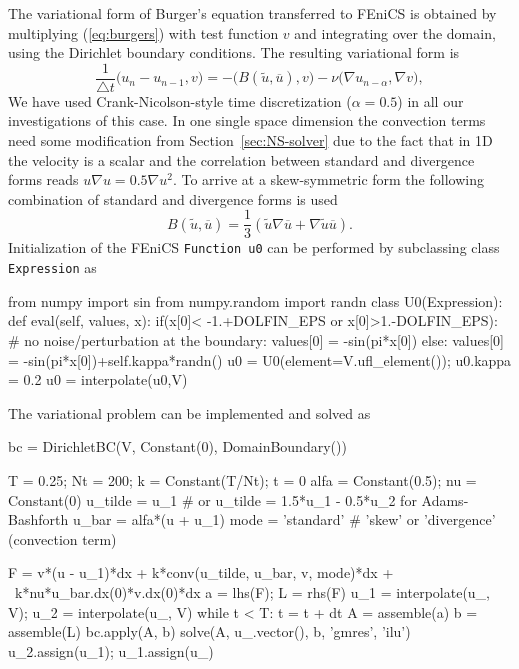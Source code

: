 The variational form of Burger's equation transferred to FEniCS is obtained by multiplying (\ref{eq:burgers}) with test function $v$ and integrating over the domain, using the Dirichlet boundary conditions. The resulting variational form is
\begin{equation}
 \frac{1}{\triangle t}\bigl( u_{n} - u_{n-1} , v\bigr) = - \bigl(B(\tilde{u},\overline{u}), v \bigr) - \nu \bigl( \nabla u_{n-\alpha}, \nabla v \bigr),
\label{eq:burgers_vf}
\end{equation}
We have used Crank-Nicolson-style time discretization ($\alpha=0.5$) in all our investigations of this case. In one single space dimension the convection terms need some modification from Section~\ref{sec:NS-solver} due to the fact that in 1D the velocity is a scalar and the correlation between standard and divergence forms reads $u\nabla u =0.5 \nabla u^2$. To arrive at a skew-symmetric form the following combination of standard and divergence forms is used
\begin{equation}
 B(\tilde{u},\overline{u}) = \frac{1}{3}\left( \tilde{u}\nabla \overline{u} + \nabla \tilde{u} \overline{u} \right).
\end{equation}
Initialization of the FEniCS
{\fontsize{12pt}{12pt}\texttt{Function u0}} can be performed by subclassing  class
{\fontsize{12pt}{12pt}\texttt{Expression}} as
\begin{fenicscode}{0.9}
from numpy import sin
from numpy.random import randn
class U0(Expression):
    def eval(self, values, x):
        if(x[0]< -1.+DOLFIN_EPS or x[0]>1.-DOLFIN_EPS):
            # no noise/perturbation at the boundary:
            values[0] = -sin(pi*x[0])
        else:
            values[0] = -sin(pi*x[0])+self.kappa*randn()
u0 = U0(element=V.ufl_element()); u0.kappa = 0.2
u0 = interpolate(u0,V)
\end{fenicscode}
The variational problem can be implemented and solved as
\begin{fenicscode}{0.9}
bc = DirichletBC(V, Constant(0), DomainBoundary())

T = 0.25; Nt = 200; k = Constant(T/Nt); t = 0
alfa = Constant(0.5); nu = Constant(0)
u_tilde = u_1 # or u_tilde = 1.5*u_1 - 0.5*u_2 for Adams-Bashforth
u_bar = alfa*(u + u_1)
mode = 'standard'  # 'skew' or 'divergence' (convection term)

F = v*(u - u_1)*dx + k*conv(u_tilde, u_bar, v, mode)*dx + \
    k*nu*u_bar.dx(0)*v.dx(0)*dx
a = lhs(F); L = rhs(F)
u_1 = interpolate(u_, V); u_2 = interpolate(u_, V)
while t < T:
    t = t + dt
    A = assemble(a)
    b = assemble(L)
    bc.apply(A, b)
    solve(A, u_.vector(), b, 'gmres', 'ilu')
    u_2.assign(u_1); u_1.assign(u_)
\end{fenicscode}

